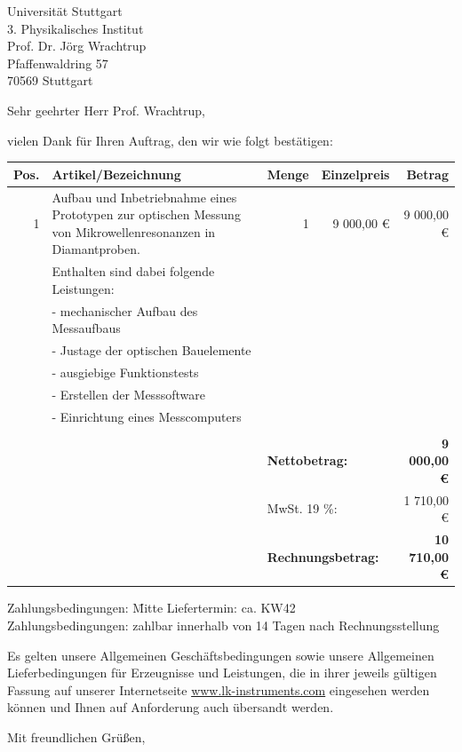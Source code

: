 \documentclass[DIN,
               paper=a4,
               fontsize=11pt,
               addrfield=on,
               enlargefirstpage=on,
               foldmarks=on,
               pagenumber=off,
               firsthead=on,
               firstfoot=on,
               parskip=full,
               addrfield=on,
               fromalign=right,
               fromemail=true,
               fromphone=true,
               fromurl=true,
               fromlogo=on,
               fromrule=off,
               numericaldate=off,
              ]{scrlttr2}
\begin{document}
\begin{letter}{Universität Stuttgart\\
               3. Physikalisches Institut\\
               Prof. Dr. Jörg Wrachtrup\\               
               Pfaffenwaldring 57\\
               70569 Stuttgart}
\opening{Sehr geehrter Herr Prof. Wrachtrup,}
vielen Dank für Ihren Auftrag, den wir wie folgt bestätigen:

\begin{tabular}{rp{7.5cm}rrr}
  \toprule
  \textbf{Pos.}&\textbf{Artikel/Bezeichnung}&\textbf{Menge}&\textbf{Einzelpreis}&\textbf{Betrag}\\
  \toprule
  1 & Aufbau und Inbetriebnahme eines Prototypen zur optischen Messung
	    von Mikrowellenresonanzen in Diamantproben. & 1 & 9 000,00 € & 9 000,00 € \\
	  & Enthalten sind dabei folgende Leistungen: & & & \\
	  & - mechanischer Aufbau des Messaufbaus & & & \\
	  & - Justage der optischen Bauelemente & & & \\
	  & - ausgiebige Funktionstests & & & \\
	  & - Erstellen der Messsoftware & & & \\
	  & - Einrichtung eines Messcomputers & & & \\
  \bottomrule
	  & & & & \\
	  & & \multicolumn{2}{l}{\textbf{Nettobetrag:}} & \textbf{9 000,00 €}\\
	  & & \multicolumn{2}{l}{MwSt. 19 \%:} & 1 710,00 €\\
	  & & \multicolumn{2}{l}{\textbf{Rechnungsbetrag:}} & \textbf{10 710,00 €}\\
\end{tabular}
\begin{tabbing}
Zahlungsbedingungen: \= Mitte \kill
Liefertermin:         \>ca. KW42\\
Zahlungsbedingungen:\> zahlbar innerhalb von 14 Tagen nach Rechnungsstellung
\end{tabbing}
Es gelten unsere Allgemeinen Geschäftsbedingungen sowie unsere Allgemeinen Lieferbedingungen für Erzeugnisse und Leistungen, die in ihrer jeweils gültigen Fassung auf unserer Internetseite \href{http://www.lk-instruments.com}{www.lk-instruments.com} eingesehen werden können und Ihnen auf Anforderung auch übersandt werden.

\closing{Mit freundlichen Grüßen,}


\end{letter}
\end{document}
